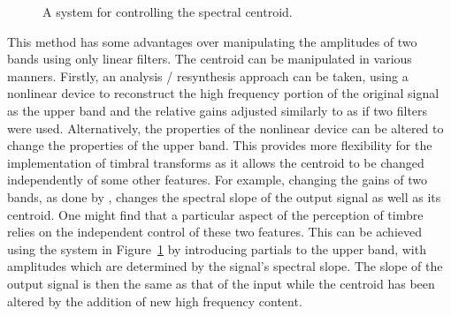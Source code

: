 			\begin{figure}[h!]
				\centering
				\caption{A system for controlling the spectral centroid.}
				\label{fig:TwoBandSpectralCentroidSystem}
			\end{figure}

			This method has some advantages over manipulating the amplitudes of two bands using only linear
			filters. The centroid can be manipulated in various manners. Firstly, an analysis / resynthesis
			approach can be taken, using a nonlinear device to reconstruct the high frequency portion of the
			original signal as the upper band and the relative gains adjusted similarly to as if two filters
			were used.  Alternatively, the properties of the nonlinear device can be altered to change the
			properties of the upper band. This provides more flexibility for the implementation of timbral
			transforms as it allows the centroid to be changed independently of some other features. For
			example, changing the gains of two bands, as done by \citet{zacharakis2011an}, changes the spectral
			slope of the output signal as well as its centroid. One might find that a particular aspect of the
			perception of timbre relies on the independent control of these two features. This can be achieved
			using the system in Figure~\ref{fig:TwoBandSpectralCentroidSystem} by introducing partials to the
			upper band, with amplitudes which are determined by the signal's spectral slope. The slope of the
			output signal is then the same as that of the input while the centroid has been altered by the
			addition of new high frequency content.

